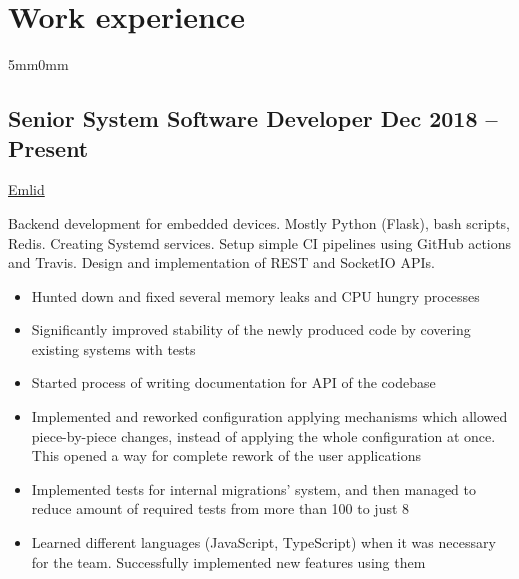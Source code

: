 \documentclass[10pt]{article}
\newcommand{\lmvalue}{5mm}
\newcommand{\rmvalue}{0mm}
\begin{document}
    \section*{Work experience}
    \begin{changemargin}{\lmvalue}{\rmvalue}
        \subsection*{Senior System Software Developer \hfill {\color{gray}Dec 2018 –
        Present}}
        \href{https://emlid.com}{Emlid}

        Backend development for embedded devices.
        Mostly Python (Flask), bash scripts, Redis.
        Creating Systemd services.
        Setup simple CI pipelines using GitHub actions and Travis.
        Design and implementation of REST and SocketIO APIs.
        \begin{itemize}
            \item Hunted down and fixed several memory leaks and CPU hungry
            processes
            \item Significantly improved stability of the newly produced
            code by covering existing systems with tests
            \item Started process of writing documentation for API of the
            codebase
            \item Implemented and reworked configuration applying
            mechanisms which allowed piece-by-piece changes, instead of applying the whole
            configuration at once.
            This opened a way for complete rework of the user applications
            \item Implemented tests for internal migrations' system, and
            then managed to reduce amount of required tests from more than 100 to just 8
            \item Learned different languages (JavaScript, TypeScript) when
            it was necessary for the team.
            Successfully implemented new features using them
        \end{itemize}


\end{changemargin}
\end{document}
